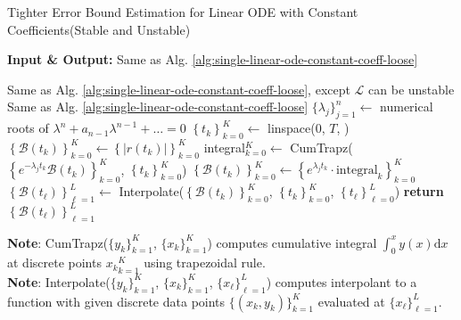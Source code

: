 \documentclass{uai2023}
\newcommand{\Bound}{\mathcal{B}}
\renewcommand{\L}{\mathcal{L}}
\begin{document}
    \begin{algorithm}
        \small
        \caption{Tighter Error Bound Estimation for Linear ODE with Constant Coefficients\quad  (Stable and Unstable)}\label{alg:single-linear-ode-constant-coeff-tight}
        \textbf{Input \& Output:} Same as Alg. \ref{alg:single-linear-ode-constant-coeff-loose}
        \begin{algorithmic}
            \Require Same as Alg. \ref{alg:single-linear-ode-constant-coeff-loose}, except $\L$ can be unstable
            \Ensure Same as Alg. \ref{alg:single-linear-ode-constant-coeff-loose}
            \State $\{\lambda_j\}_{j=1}^{n} \gets$ numerical roots of $\lambda^n+a_{n-1}\lambda^{n-1}+\dots=0$
            \State $\left\{t_k\right\}_{k=0}^{K} \gets$ linspace($0$, $T$, )
            \State $\left\{\Bound(t_k)\right\}_{k=0}^{K} \gets \left\{|r(t_k)|\right\}_{k=0}^{K}$
                \State integral$_{k=0}^{K} \gets$ CumTrapz($\left\{e^{-\lambda_j t_{k}} \Bound(t_k)\right\}_{k=0}^{K}$, $\left\{t_k\right\}_{k=0}^{K}$) 
                \State $\left\{\Bound(t_k)\right\}_{k=0}^{K} \gets \left\{e^{\lambda_j t_{k}}\cdot \text{integral}_k \right\}_{k=0}^{K}$ 
            \EndFor
            \State $\left\{\Bound(t_\ell)\right\}_{\ell=1}^{L} \gets $ Interpolate($\left\{\Bound(t_k)\right\}_{k=0}^{K}$, $\left\{t_k\right\}_{k=0}^{K}$, $\left\{t_\ell\right\}_{\ell=0}^{L}$) 
            \State \textbf{return} $\left\{\Bound(t_\ell)\right\}_{\ell=1}^{L}$ 
        \end{algorithmic}

        \vspace{0.5em} 
        \textbf{Note}: CumTrapz($\{y_k\}_{k=1}^K$, $\{x_k\}_{k=1}^K$) computes cumulative integral $\int_{0}^x y(x)\mathrm{d}x$ at discrete points ${x_k}_{k=1}^K$ using trapezoidal rule.\\
        \textbf{Note}: Interpolate($\{y_k\}_{k=1}^K$, $\{x_k\}_{k=1}^K$, $\{x_\ell\}_{\ell=1}^L$) computes interpolant to a function with given discrete data points $\{(x_k, y_k)\}_{k=1}^K$ evaluated at $\{x_\ell\}_{\ell=1}^L$.
    \end{algorithm}
\end{document}
